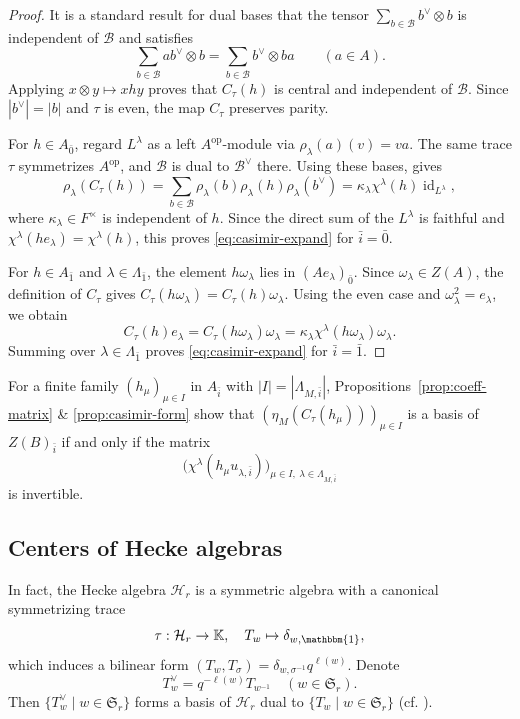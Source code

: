 \documentclass[11pt]{amsart}
\numberwithin{equation}{section}
\theoremstyle{plain}
\theoremstyle{definition}
\theoremstyle{remark}
\newcommand{\id}{\operatorname{id}}
\begin{document}
\begin{proof}
It is a standard result for dual bases that the tensor
$\sum_{b\in\mathcal B}b^\vee\otimes b$ is independent of
$\mathcal B$ and satisfies
$$
\sum_{b\in\mathcal B}ab^\vee\otimes b
=
\sum_{b\in\mathcal B}b^\vee\otimes ba
\qquad(a\in A).
$$
Applying $x\otimes y\mapsto xhy$ proves that $C_\tau(h)$ is central
and independent of $\mathcal B$. Since $|b^\vee|=|b|$ and $\tau$ is even, the map $C_\tau$ preserves parity.

For $h\in A_{\bar0}$, regard $L^\lambda$ as a left
$A^{\operatorname{op}}$-module via $\rho_\lambda(a)(v)=va$.
The same trace $\tau$ symmetrizes $A^{\operatorname{op}}$, and
$\mathcal B$ is dual to $\mathcal B^\vee$ there.
Using these bases, \cite[Lemma~5.2 \& Proposition~5.4]{WW13} gives
$$
\rho_\lambda(C_\tau(h))
=
\sum_{b\in\mathcal B}
\rho_\lambda(b)\rho_\lambda(h)\rho_\lambda(b^\vee)
=
\kappa_\lambda\chi^\lambda(h)\id_{L^\lambda},
$$
where $\kappa_\lambda\in F^\times$ is independent of $h$.
Since the direct sum of the $L^\lambda$ is faithful and
$\chi^\lambda(he_\lambda)=\chi^\lambda(h)$, this proves
\eqref{eq:casimir-expand} for $\bar i=\bar0$.

For $h\in A_{\bar1}$ and $\lambda\in\Lambda_{\bar1}$,
the element $h\omega_\lambda$ lies in $(Ae_\lambda)_{\bar0}$.
Since $\omega_\lambda\in Z(A)$, the definition of $C_\tau$
gives $C_\tau(h\omega_\lambda)=C_\tau(h)\omega_\lambda$.
Using the even case and $\omega_\lambda^2=e_\lambda$, we obtain
$$
C_\tau(h)e_\lambda
=
C_\tau(h\omega_\lambda)\omega_\lambda
=
\kappa_\lambda\chi^\lambda(h\omega_\lambda)\omega_\lambda.
$$
Summing over $\lambda\in\Lambda_{\bar1}$ proves
\eqref{eq:casimir-expand} for $\bar i=\bar1$.
\end{proof}

For a finite family $(h_\mu)_{\mu\in I}$ in $A_{\bar i}$ with
$|I|=|\Lambda_{M,\bar i}|$, Propositions~\ref{prop:coeff-matrix}
\& \ref{prop:casimir-form} show that
$(\eta_M(C_\tau(h_\mu)))_{\mu\in I}$ is a basis of $Z(B)_{\bar i}$
if and only if the matrix
$$
\bigl(\chi^\lambda(h_\mu u_{\lambda,\bar i})\bigr)_
{\mu\in I,\ \lambda\in\Lambda_{M,\bar i}}
$$
is invertible.

\subsection{Centers of Hecke algebras}
In fact, the Hecke algebra $\mathcal H_r$ is a symmetric algebra with a canonical symmetrizing trace 
$$\tau:\mathcal H_r\to \mathbb{K}, \quad T_w\mapsto \delta_{w,\mathbbm{1}},$$
which induces a bilinear form 
$(T_w,T_\sigma)=\delta_{w,\sigma^{-1}}q^{\ell(w)}$.
Denote 
$$T_w^\vee=q^{-\ell(w)}T_{w^{-1}}
\quad(w\in\mathfrak S_r).
$$
Then $\{T_w^\vee\mid w\in\mathfrak S_r\}$ forms a basis of $\mathcal H_r$ dual to
$\{T_w\mid w\in\mathfrak S_r\}$ (cf. \cite[\S2.2]{WW15}).
\end{document}
